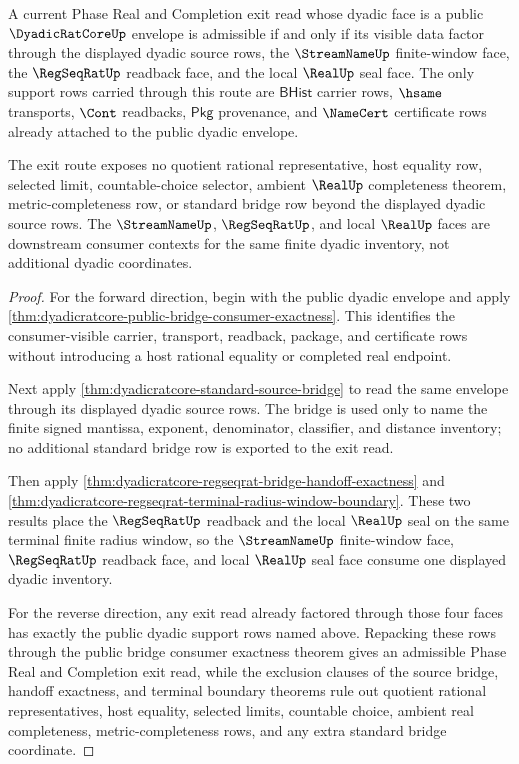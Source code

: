 \begin{theorem}
\label{thm:dyadicratcore-open-phase-exit-criterion}
A current Phase Real and Completion exit read whose dyadic face is a public
$\DyadicRatCoreUp$ envelope is admissible if and only if its visible data
factor through the displayed dyadic source rows, the $\StreamNameUp$
finite-window face, the $\RegSeqRatUp$ readback face, and the local $\RealUp$
seal face. The only support rows carried through this route are
$\mathsf{BHist}$ carrier rows, $\hsame$ transports, $\Cont$ readbacks,
$\mathsf{Pkg}$ provenance, and $\NameCert$ certificate rows already attached to
the public dyadic envelope.

The exit route exposes no quotient rational representative, host equality row,
selected limit, countable-choice selector, ambient $\RealUp$ completeness
theorem, metric-completeness row, or standard bridge row beyond the displayed
dyadic source rows. The $\StreamNameUp$, $\RegSeqRatUp$, and local $\RealUp$
faces are downstream consumer contexts for the same finite dyadic inventory,
not additional dyadic coordinates.
\end{theorem}
\begin{proof}
For the forward direction, begin with the public dyadic envelope and apply
\autoref{thm:dyadicratcore-public-bridge-consumer-exactness}. This identifies
the consumer-visible carrier, transport, readback, package, and certificate
rows without introducing a host rational equality or completed real endpoint.

Next apply \autoref{thm:dyadicratcore-standard-source-bridge} to read the same
envelope through its displayed dyadic source rows. The bridge is used only to
name the finite signed mantissa, exponent, denominator, classifier, and
distance inventory; no additional standard bridge row is exported to the exit
read.

Then apply \autoref{thm:dyadicratcore-regseqrat-bridge-handoff-exactness} and
\autoref{thm:dyadicratcore-regseqrat-terminal-radius-window-boundary}. These
two results place the $\RegSeqRatUp$ readback and the local $\RealUp$ seal on
the same terminal finite radius window, so the $\StreamNameUp$ finite-window
face, $\RegSeqRatUp$ readback face, and local $\RealUp$ seal face consume one
displayed dyadic inventory.

For the reverse direction, any exit read already factored through those four
faces has exactly the public dyadic support rows named above. Repacking these
rows through the public bridge consumer exactness theorem gives an admissible
Phase Real and Completion exit read, while the exclusion clauses of the source
bridge, handoff exactness, and terminal boundary theorems rule out quotient
rational representatives, host equality, selected limits, countable choice,
ambient real completeness, metric-completeness rows, and any extra standard
bridge coordinate.
\end{proof}


